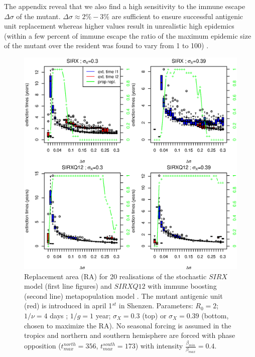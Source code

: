 The appendix reveal that we also find a high sensitivity to the immune
escape $\Delta\sigma$ of the mutant. $\Delta\sigma\approx2\%-3\%$ are
sufficient to ensure successful antigenic unit replacement whereas
higher values result in unrealistic high epidemics (within a few
percent of immune escape the ratio of the maximum epidemic size of the
mutant over the resident was found to vary from 1 to 100) .

\begin{figure}[htp]
  \center
  \includegraphics[width=0.7\linewidth]{texte/article3/graph/sirx_s03_039_final.eps}
  \caption{Replacement area (RA) for 20 realisations of the stochastic
    $SIRX$ model (first line figures) and $SIRXQ12$ with immune boosting (second line)
    metapopulation model . The mutant antigenic unit (red) is
    introduced in april 1$^{st}$ in Shenzen.  Parameters: $R_0=2$; $1/\nu=4$ days ; $1/g=1$
    year; $\sigma_{X}=0.3$
    (top) or $\sigma_{X}=0.39$ (bottom, chosen to maximize the RA). No seasonal forcing is assumed in the tropics and northern
    and southern hemisphere are forced with phase opposition
    ($t^{north}_{max}= 356$, $t^{south}_{max}= 173$) with intensity
    $\frac{\beta_{min}}{\beta_{max}}=0.4$.}
  \label{fig:sirx_s03_039}
\end{figure}


